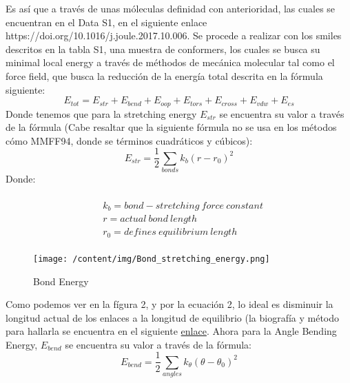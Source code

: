 \documentclass{article}%
\begin{document}
%
Es así que a través de unas móleculas definidad con anterioridad, las cuales se encuentran en el Data S1, en el siguiente enlace https://doi.org/10.1016/j.joule.2017.10.006. Se procede a realizar con los smiles descritos en la tabla S1, una muestra de conformers, los cuales se busca su minimal local energy a través de méthodos de mecánica molecular tal como el force field, que busca la reducción de la energía total descrita en la fórmula siguiente:%
\begin{equation}
    E_{tot} = E_{str} + E_{bend} + E_{oop} + E_{tors} + E_{cross} + E_{vdw} + E_{es} 
\end{equation}%
Donde tenemos que para la stretching energy $E_{str}$ se encuentra su valor a través de la fórmula (Cabe resaltar que la siguiente fórmula no se usa en los métodos cómo MMFF94, donde se términos cuadráticos y cúbicos):%
\begin{equation}
    E_{str} = \frac{1}{2} \sum_{bonds} k_b(r-r_0)^2%
\end{equation}%
Donde:
\begin{fleqn}
\begin{equation*}
\begin{alignedat}{2}
\\ &k_b = bond-stretching \ force \ constant \\  
&r = actual\ bond\ length \\ 
&r_0 = defines\ equilibrium\ length\\
\end{alignedat}
\end{equation*}
\end{fleqn}%


\begin{figure}[H]%
\centering%
\texttt{[image: /content/img/Bond\_stretching\_energy.png]}%
\caption{Bond Energy}%
\end{figure}

%
Como podemos ver en la fígura 2, y por la ecuación 2, lo ideal es disminuir la longitud actual de los enlaces a la longitud de equilibrio (la biografía y método para hallarla se encuentra en el siguiente \href{https://chem.libretexts.org/Bookshelves/Physical_and_Theoretical_Chemistry_Textbook_Maps/Supplemental_Modules_(Physical_and_Theoretical_Chemistry)/Chemical_Bonding/Fundamentals_of_Chemical_Bonding/Bond_Order_and_Lengths}{enlace}. Ahora para la Angle Bending Energy, $E_{bend}$ se encuentra su valor a través de la fórmula:%
\begin{equation}
    E_{bend} = \frac{1}{2} \sum_{angles} k_\theta (\theta - \theta_0)^2
\end{equation}%
\end{document}
